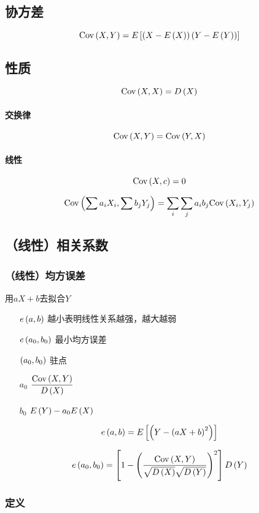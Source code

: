 \documentclass{article}
\begin{document}
\subsection{协方差}

\[\mathrm{Cov}\left(X,Y\right)=E\left[\left(X-E\left(X\right)\right)\left(Y-E\left(Y\right)\right)\right]\]

\subsection{性质}

\[\mathrm{Cov}\left(X,X\right)=D\left(X\right)\]

\paragraph{交换律}

\[\mathrm{Cov}\left(X,Y\right)=\mathrm{Cov}\left(Y,X\right)\]

\paragraph{线性}

\[\mathrm{Cov}\left(X,c\right)=0\]

\[\mathrm{Cov}\left(\sum a_iX_i,\sum b_jY_j\right)=\sum_i\sum_ja_ib_j\mathrm{Cov}\left(X_i,Y_j\right)\]

\subsection{（线性）相关系数}

\subsubsection{（线性）均方误差}

用$aX+b$去拟合$Y$

\begin{enumerate}
    \item [$e\left(a,b\right)$] 越小表明线性关系越强，越大越弱
    \item [$e\left(a_0,b_0\right)$] 最小均方误差
    \item [$\left(a_0,b_0\right)$] 驻点
    \item [$a_0$] $\dfrac{\mathrm{Cov}\left(X,Y\right)}{D\left(X\right)}$
    \item [$b_0$] $E\left(Y\right)-a_0E\left(X\right)$
\end{enumerate}

\[e\left(a,b\right)=E\left[\left(Y-{\left(aX+b\right)}^2\right)\right]\]

\[e\left(a_0,b_0\right)=\left[1-{\left(\frac{\mathrm{Cov}\left(X,Y\right)}{\sqrt{D\left(X\right)}\sqrt{D\left(Y\right)}}\right)}^2\right]D\left(Y\right)\]

\subsubsection{定义}
\end{document}
